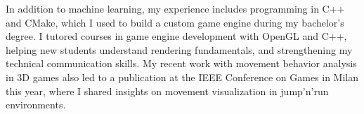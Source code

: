 In addition to machine learning, my experience 
includes programming in C++ and CMake, 
which I used to build a custom game engine during my bachelor’s degree. 
I tutored courses in game engine development with OpenGL and C++, 
helping new students understand rendering fundamentals, 
and strengthening my technical communication skills. 
My recent work with movement behavior analysis in 3D games also led to a publication 
at the IEEE Conference on Games in Milan this year, 
where I shared insights on movement visualization in jump'n'run environments.